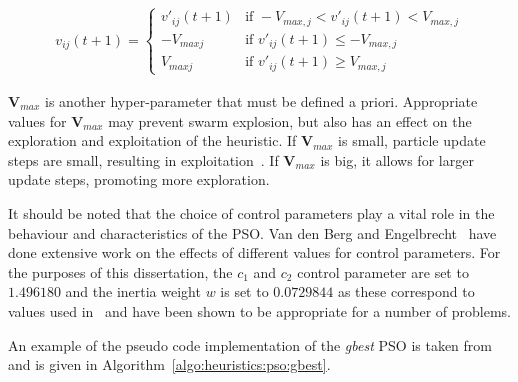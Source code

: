 \begin{equation}
      \label{eq:heuristics:pso:velocity_clamping}
      \begin{split}
            v_{ij}(t+1)=
            \begin{cases}
                  v'_{ij}(t+1) & \text{if } -V_{max,j} < v'_{ij}(t+1) < V_{max,j} \\
                  -V_{maxj}    & \text{if } v'_{ij}(t+1) \leq -V_{max,j}          \\
                  V_{maxj}     & \text{if } v'_{ij}(t+1) \geq V_{max,j}
            \end{cases}
      \end{split}
\end{equation}

$\boldsymbol{V}_{max}$ is another hyper-parameter that must be defined a priori. Appropriate values for $\boldsymbol{V}_{max}$ may prevent swarm explosion, but also has an effect on the exploration and exploitation of the heuristic. If $\boldsymbol{V}_{max}$ is small, particle update steps are small, resulting in exploitation~\cite{ref:eberhart:1996}. If $\boldsymbol{V}_{max}$ is big, it allows for larger update steps, promoting more exploration.

It should be noted that the choice of control parameters play a vital role in the behaviour and characteristics of the \acs{PSO}. Van den Berg and Engelbrecht~\cite{ref:vandenberg:2007, ref:vandenberg:2006} have done extensive work on the effects of different values for control parameters. For the purposes of this dissertation, the $c_{1}$ and $c_{2}$ control parameter are set to $1.496180$ and the inertia weight $w$ is set to $0.0729844$ as these correspond to values used in~\cite{ref:eberhart:2000} and have been shown to be appropriate for a number of problems.

An example of the pseudo code implementation of the \textit{gbest} \acs{PSO} is taken from~\cite{ref:engelbrecht:2007} and is given in Algorithm~\ref{algo:heuristics:pso:gbest}.

